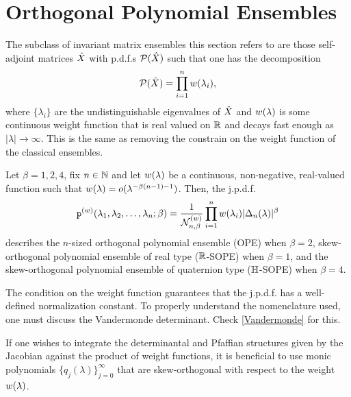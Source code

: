 \section{Orthogonal Polynomial Ensembles}

The subclass of invariant matrix ensembles this section refers to are those self-adjoint matrices $\hat X$ with p.d.f.s $\mathcal{P}(\hat X)$ such that one has the decomposition
\begin{equation}
	\mathcal{P}(\hat X) = \prod_{i=1}^n w(\lambda_i),
\end{equation}
where $\{\lambda_i\}$ are the undistinguishable eigenvalues of $\hat X$ and $w(\lambda)$ is some continuous weight function that is real valued on $\mathbb{R}$ and decays fast enough as $|\lambda| \rightarrow \infty$. This is the same as removing the constrain on the weight function of the classical ensembles.

\begin{definition}
	Let $\beta = 1, 2, 4$, fix $n \in \mathbb{N}$ and let $w(\lambda)$ be a continuous, non-negative, real-valued function such that $w(\lambda) = o(\lambda^{-\beta(n-1)-1})$. Then, the j.p.d.f.
	\begin{equation}
		\mathtt{p}^{(w)}(\lambda_1, \lambda_2, \dots, \lambda_n;\beta) = \frac{1}{\mathcal{N}_{n,\beta}^{(w)}} \prod_{i=1}^{n} w(\lambda_i) |\Delta_n(\lambda)|^\beta
	\end{equation}
	describes the $n$-sized orthogonal polynomial ensemble (OPE) when $\beta = 2$, skew-orthogonal polynomial ensemble of real type ($\mathbb{R}$-SOPE) when $\beta=1$, and the skew-orthogonal polynomial ensemble of quaternion type ($\mathbb{H}$-SOPE) when $\beta = 4$.
	\label{Definition: measure-weight}
\end{definition}

The condition on the weight function guarantees that the j.p.d.f. has a well-defined normalization constant. To properly understand the nomenclature used, one must discuss the Vandermonde determinant. Check \ref{Vandermonde} for this. 

If one wishes to integrate the determinantal and Pfaffian structures given by the Jacobian against the product of weight functions, it is beneficial to use monic polynomials $\{q_j(\lambda)\}_{j=0}^\infty$ that are skew-orthogonal with respect to the weight $w(\lambda)$.

